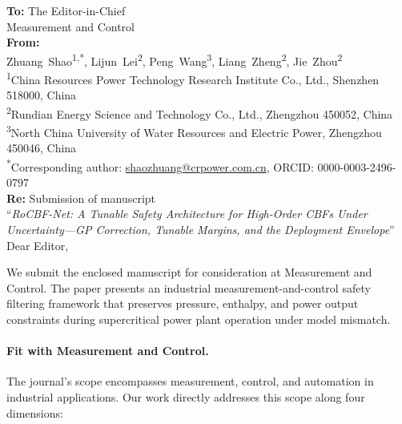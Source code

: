 \documentclass[11pt,a4paper]{article}
\begin{document}
\noindent\textbf{To:} The Editor-in-Chief\\
Measurement and Control\\[1em]

\noindent\textbf{From:}\\
Zhuang~Shao\textsuperscript{1,*}, Lijun~Lei\textsuperscript{2}, Peng~Wang\textsuperscript{3}, Liang~Zheng\textsuperscript{2}, Jie~Zhou\textsuperscript{2}\\[0.5em]
\textsuperscript{1}China Resources Power Technology Research Institute Co., Ltd., Shenzhen 518000, China\\
\textsuperscript{2}Rundian Energy Science and Technology Co., Ltd., Zhengzhou 450052, China\\
\textsuperscript{3}North China University of Water Resources and Electric Power, Zhengzhou 450046, China\\[0.5em]
\textsuperscript{*}Corresponding author: \href{mailto:shaozhuang@crpower.com.cn}{shaozhuang@crpower.com.cn}, ORCID: 0000-0003-2496-0797\\[1em]

\noindent\textbf{Re:} Submission of manuscript\\
``\emph{RoCBF-Net: A Tunable Safety Architecture for High-Order CBFs Under Uncertainty---GP Correction, Tunable Margins, and the Deployment Envelope}''\\[1em]

\noindent Dear Editor,

We submit the enclosed manuscript for consideration at Measurement and Control. The paper presents an industrial measurement-and-control safety filtering framework that preserves pressure, enthalpy, and power output constraints during supercritical power plant operation under model mismatch.

\paragraph{Fit with Measurement and Control.}
The journal's scope encompasses measurement, control, and automation in industrial applications. Our work directly addresses this scope along four dimensions:
\end{document}
